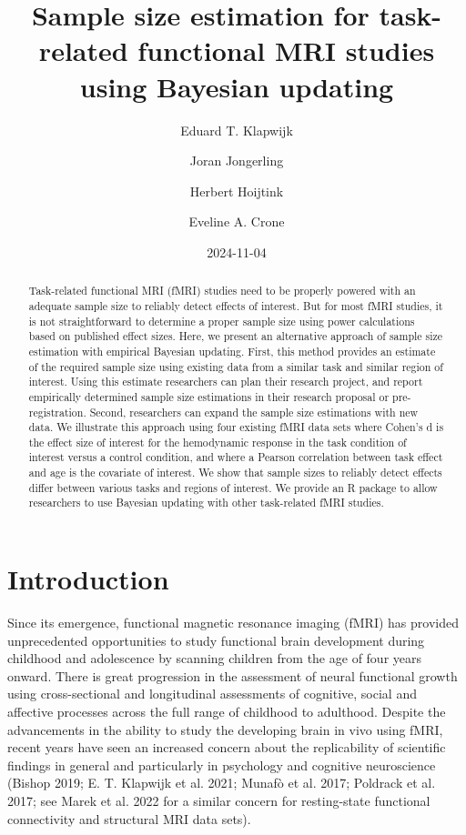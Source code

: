 \documentclass[
  letterpaper,
  DIV=11,
  numbers=noendperiod]{scrartcl}
\title{Sample size estimation for task-related functional MRI studies
using Bayesian updating}
\author{Eduard T. Klapwijk \and Joran Jongerling \and Herbert
Hoijtink \and Eveline A. Crone}
\date{2024-11-04}
\begin{document}
\maketitle
\begin{abstract}
Task-related functional MRI (fMRI) studies need to be properly powered
with an adequate sample size to reliably detect effects of interest. But
for most fMRI studies, it is not straightforward to determine a proper
sample size using power calculations based on published effect sizes.
Here, we present an alternative approach of sample size estimation with
empirical Bayesian updating. First, this method provides an estimate of
the required sample size using existing data from a similar task and
similar region of interest. Using this estimate researchers can plan
their research project, and report empirically determined sample size
estimations in their research proposal or pre-registration. Second,
researchers can expand the sample size estimations with new data. We
illustrate this approach using four existing fMRI data sets where
Cohen's d is the effect size of interest for the hemodynamic response in
the task condition of interest versus a control condition, and where a
Pearson correlation between task effect and age is the covariate of
interest. We show that sample sizes to reliably detect effects differ
between various tasks and regions of interest. We provide an R package
to allow researchers to use Bayesian updating with other task-related
fMRI studies.
\end{abstract}


\section{Introduction}\label{introduction}

Since its emergence, functional magnetic resonance imaging (fMRI) has
provided unprecedented opportunities to study functional brain
development during childhood and adolescence by scanning children from
the age of four years onward. There is great progression in the
assessment of neural functional growth using cross-sectional and
longitudinal assessments of cognitive, social and affective processes
across the full range of childhood to adulthood. Despite the
advancements in the ability to study the developing brain in vivo using
fMRI, recent years have seen an increased concern about the
replicability of scientific findings in general and particularly in
psychology and cognitive neuroscience (Bishop 2019; E. T. Klapwijk et
al. 2021; Munafò et al. 2017; Poldrack et al. 2017; see Marek et al.
2022 for a similar concern for resting-state functional connectivity and
structural MRI data sets).
\end{document}
